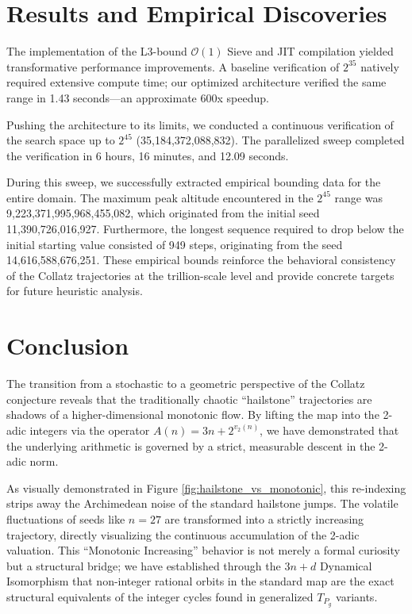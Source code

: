 \documentclass[11pt, a4paper]{article}
\theoremstyle{definition}
\begin{document}
\section{Results and Empirical Discoveries}

The implementation of the L3-bound $\mathcal{O}(1)$ Sieve and JIT compilation yielded transformative performance improvements. A baseline verification of $2^{35}$ natively required extensive compute time; our optimized architecture verified the same range in 1.43 seconds---an approximate 600x speedup.

Pushing the architecture to its limits, we conducted a continuous verification of the search space up to $2^{45}$ (35,184,372,088,832). The parallelized sweep completed the verification in 6 hours, 16 minutes, and 12.09 seconds.

During this sweep, we successfully extracted empirical bounding data for the entire domain. The maximum peak altitude encountered in the $2^{45}$ range was 9,223,371,995,968,455,082, which originated from the initial seed 11,390,726,016,927. Furthermore, the longest sequence required to drop below the initial starting value consisted of 949 steps, originating from the seed 14,616,588,676,251. These empirical bounds reinforce the behavioral consistency of the Collatz trajectories at the trillion-scale level and provide concrete targets for future heuristic analysis.

\section{Conclusion}

The transition from a stochastic to a geometric perspective of the Collatz conjecture reveals that the traditionally chaotic ``hailstone'' trajectories are shadows of a higher-dimensional monotonic flow. By lifting the map into the 2-adic integers via the operator $A(n) = 3n + 2^{v_2(n)}$, we have demonstrated that the underlying arithmetic is governed by a strict, measurable descent in the 2-adic norm. 

As visually demonstrated in Figure \ref{fig:hailstone_vs_monotonic}, this re-indexing strips away the Archimedean noise of the standard hailstone jumps. The volatile fluctuations of seeds like $n=27$ are transformed into a strictly increasing trajectory, directly visualizing the continuous accumulation of the 2-adic valuation. This ``Monotonic Increasing'' behavior is not merely a formal curiosity but a structural bridge; we have established through the $3n+d$ Dynamical Isomorphism that non-integer rational orbits in the standard map are the exact structural equivalents of the integer cycles found in generalized $T_{P_g}$ variants. 
\end{document}
